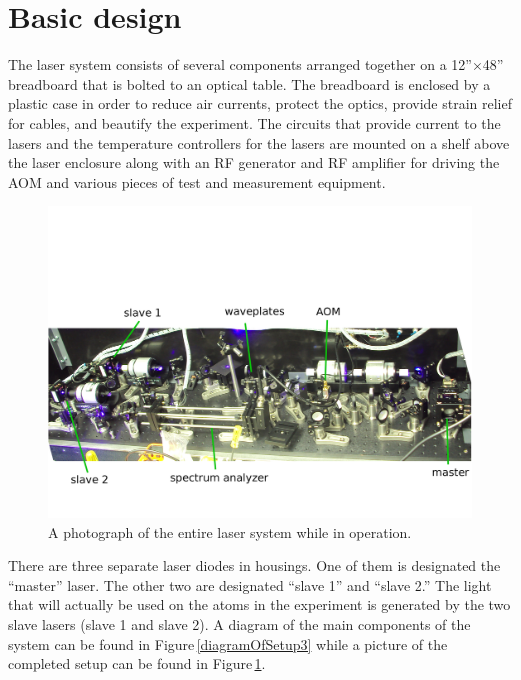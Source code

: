 \section{Basic design}
The laser system consists of several components arranged together on a 12''$\times$48'' breadboard that is bolted to an optical table. The breadboard is enclosed by a plastic case in order to reduce air currents, protect the optics, provide strain relief for cables, and beautify the experiment. The circuits that provide current to the lasers and the temperature controllers for the lasers are mounted on a shelf above the laser enclosure along with an RF generator and RF amplifier for driving the AOM and various pieces of test and measurement equipment.  
\begin{figure}
    \centerline{\includegraphics[width=1\textwidth]{entire_setup}}
    \caption[Photo of Entire System]{\label{fullexperimentphoto}
A photograph of the entire laser system while in operation.
    }
\end{figure}

There are three separate laser diodes in housings. One of them is designated the ``master'' laser. The other two are designated ``slave 1'' and ``slave 2.'' The light that will actually be used on the atoms in the experiment is generated by the two slave lasers (slave 1 and slave 2).
 A diagram of the main components of the system can be found in Figure\,\ref{diagramOfSetup3} while a picture of the completed setup can be found in Figure\,\ref{fullexperimentphoto}. 

